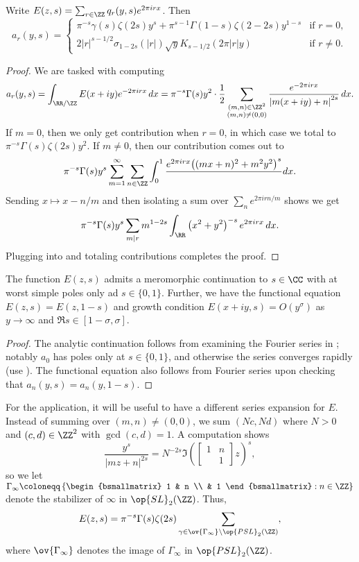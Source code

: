 \documentclass{article}
\begin{document}
\begin{proposition} \label{prop:fourier-expansion-eisenstein}
	Write $E(z,s)=\sum_{r\in\ZZ}q_r(y,s)e^{2\pi irx}$. Then
	\[a_r(y,s)=\begin{cases}
		\pi^{-s}\gamma(s)\zeta(2s)y^s+\pi^{s-1}\Gamma(1-s)\zeta(2-2s)y^{1-s} & \text{if }r=0, \\
		2\left|r\right|^{s-1/2}\sigma_{1-2s}(\left|r\right|)\sqrt yK_{s-1/2}(2\pi\left|r\right|y) & \text{if }r\ne0.
	\end{cases}\]
\end{proposition}
\begin{proof}
	We are tasked with computing
	\[a_r(y,s)=\int_{\RR/\ZZ}E(x+iy)e^{-2\pi irx}\,dx=\pi^{-s}\Gamma(s)y^2\cdot\frac12\sum_{\substack{(m,n)\in\ZZ^2\\(m,n)\ne(0,0)}}\frac{e^{-2\pi irx}}{\left|m(x+iy)+n\right|^{2s}}\,dx.\]
	If $m=0$, then we only get contribution when $r=0$, in which case we total to $\pi^{-s}\Gamma(s)\zeta(2s)y^2$. If $m\ne0$, then our contribution comes out to
	\[\pi^{-s}\Gamma(s)y^s\sum_{m=1}^\infty\sum_{n\in\ZZ}\int_{0}^1\frac{e^{2\pi irx}{\left((mx+n)^2+m^2y^2\right)^s}}\,dx.\]
	Sending $x\mapsto x-n/m$ and then isolating a sum over $\sum_ne^{2\pi irn/m}$ shows we get
	\[\pi^{-s}\Gamma(s)y^s\sum_{m\mid r}m^{1-2s}\int_\RR\left(x^2+y^2\right)^{-s}e^{2\pi irx}\,dx.\]
	Plugging into  and totaling contributions completes the proof.
\end{proof}
\begin{corollary} \label{cor:eisenstein-continuation}
	The function $E(z,s)$ admits a meromorphic continuation to $s\in\CC$ with at worst simple poles only ad $s\in\{0,1\}$. Further, we have the functional equation $E(z,s)=E(z,1-s)$ and growth condition $E(x+iy,s)=O\left(y^\sigma\right)$ as $y\to\infty$ and $\Re s\in[1-\sigma,\sigma]$.
\end{corollary}
\begin{proof}
	The analytic continuation follows from examining the Fourier series in ; notably $a_0$ has poles only at $s\in\{0,1\}$, and otherwise the series converges rapidly (use ). The functional equation also follows from Fourier series upon checking that $a_n(y,s)=a_n(y,1-s)$.
\end{proof}
For the application, it will be useful to have a different series expansion for $E$. Instead of summing over $(m,n)\ne(0,0)$, we sum $(Nc,Nd)$ where $N>0$ and $(c,d)\in\ZZ^2$ with $\gcd(c,d)=1$. A computation shows
\[\frac{y^s}{\left|mz+n\right|^{2s}}=N^{-2s}\Im\left(\begin{bmatrix}
	1 & n \\ & 1
\end{bmatrix}z\right)^s,\]
so we let $\Gamma_\infty\coloneqq\left\{\begin{bsmallmatrix}
	1 & n \\ & 1
\end{bsmallmatrix}:n\in\ZZ\right\}$ denote the stabilizer of $\infty$ in $\op{SL}_2(\ZZ)$. Thus,
\[E(z,s)=\pi^{-s}\Gamma(s)\zeta(2s)\sum_{\gamma\in\ov{\Gamma_\infty}\backslash\op{PSL}_2(\ZZ)},\]
where $\ov{\Gamma_\infty}$ denotes the image of $\Gamma_\infty$ in $\op{PSL}_2(\ZZ)$.
\end{document}
